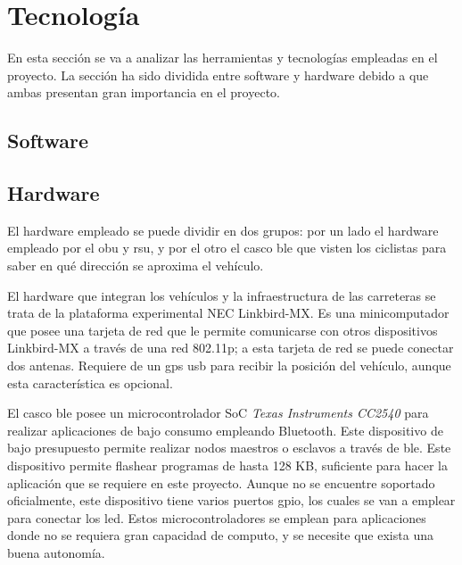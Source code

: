 \section{Tecnología}
En esta sección se va a analizar las herramientas y tecnologías empleadas en
el proyecto. La sección ha sido dividida entre software y hardware debido a que
ambas presentan gran importancia en el proyecto.

\subsection{Software}

\subsection{Hardware}
El hardware empleado se puede dividir en dos grupos: por un lado el hardware
empleado por el \gls{obu} y \gls{rsu}, y por el otro el casco \gls{ble} que
visten los ciclistas para saber en qué dirección se aproxima el vehículo.

El hardware que integran los vehículos y la infraestructura de las carreteras
se trata de la plataforma experimental NEC Linkbird-MX. Es una minicomputador
que posee una tarjeta de red que le permite comunicarse con otros dispositivos
Linkbird-MX a través de una red \Gls{802.11p}; a esta tarjeta de red se puede
conectar dos antenas. Requiere de un \gls{gps} \gls{usb} para recibir la
posición del vehículo, aunque esta característica es opcional.

El casco \gls{ble} posee un microcontrolador \gls{SoC} \emph{ Texas Instruments
CC2540} para realizar aplicaciones de bajo consumo empleando Bluetooth. Este
dispositivo de bajo presupuesto permite realizar nodos maestros o esclavos
a través de \gls{ble}. Este dispositivo permite flashear programas de hasta
128 KB, suficiente para hacer la aplicación que se requiere en este proyecto.
Aunque no se encuentre soportado oficialmente, este dispositivo tiene varios
puertos \gls{gpio}, los cuales se van a emplear para conectar los led. Estos
microcontroladores se emplean para aplicaciones donde no se requiera gran
capacidad de computo, y se necesite que exista una buena autonomía.
